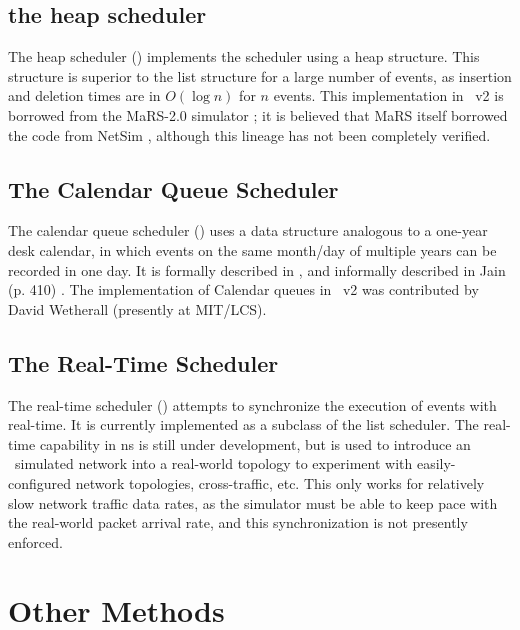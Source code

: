 \subsection{the heap scheduler}
\label{sec:heapsched}

The heap scheduler ()
implements the scheduler using a heap structure.
This structure is superior to the list structure for a large number
of events, as insertion and deletion times are in $O(\log n)$
for $n$ events.
This implementation in \ns~v2 is borrowed from the
MaRS-2.0 simulator \cite{Alae94:Design};
it is believed that MaRS itself borrowed the code
from NetSim \cite{Heyb89:Netsim},
although this lineage has not been completely verified.

\subsection{The Calendar Queue Scheduler}
\label{sec:cqsched}

The calendar queue scheduler
()
uses a data structure analogous to a one-year desk calendar,
in which events on the same month/day of multiple years can be recorded in
one day.
It is formally described in \cite{Brow88:Calendar}, and informally described
in Jain (p. 410) \cite{Jain91:Art}.
The implementation of Calendar queues in \ns~v2
was contributed by David Wetherall (presently at MIT/LCS).

\subsection{The Real-Time Scheduler}
\label{sec:rtsched}

The real-time scheduler ()
attempts to synchronize the execution of events with real-time.
It is currently implemented as a subclass of the list scheduler.
The real-time capability in ns is still under development, but is used
to introduce an \ns\ simulated network into a real-world topology
to experiment with easily-configured network topologies, cross-traffic, etc. 
This only works for relatively slow network traffic data rates, as the
simulator must be able to keep pace with the real-world packet arrival
rate, and this synchronization is not presently enforced.

\section{Other Methods}
\label{sec:other}

